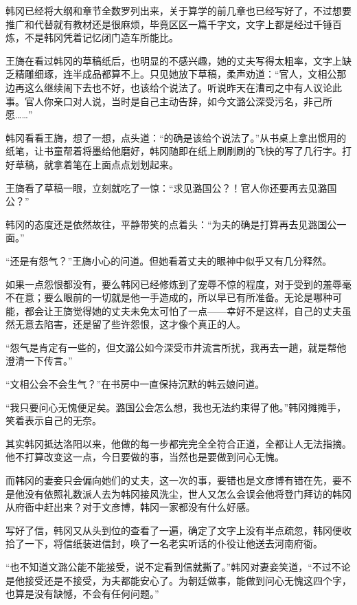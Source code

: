 韩冈已经将大纲和章节全数罗列出来，关于算学的前几章也已经写好了，不过想要推广和代替就有教材还是很麻烦，毕竟区区一篇千字文，文字上都是经过千锤百炼，不是韩冈凭着记忆闭门造车所能比。

王旖在看过韩冈的草稿纸后，也明显的不感兴趣，她的丈夫写得太粗率，文字上缺乏精雕细琢，连半成品都算不上。只见她放下草稿，柔声劝道：“官人，文相公那边再这么继续闹下去也不好，也该给个说法了。听说昨天在漕司之中有人议论此事。官人你亲口对人说，当时是自己主动告辞，如今文潞公深受污名，非己所愿……”

韩冈看看王旖，想了一想，点头道：“的确是该给个说法了。”从书桌上拿出惯用的纸笔，让书童帮着将墨给他磨好，韩冈随即在纸上刷刷刷的飞快的写了几行字。打好草稿，就拿着笔在上面点点划划起来。

王旖看了草稿一眼，立刻就吃了一惊：“求见潞国公？！官人你还要再去见潞国公？”

韩冈的态度还是依然故往，平静带笑的点着头：“为夫的确是打算再去见潞国公一面。”

“还是有怨气？”王旖小心的问道。但她看着丈夫的眼神中似乎又有几分释然。

如果一点怨恨都没有，要么韩冈已经修炼到了宠辱不惊的程度，对于受到的羞辱毫不在意；要么眼前的一切就是他一手造成的，所以早已有所准备。无论是哪种可能，都会让王旖觉得她的丈夫未免太可怕了一点——幸好不是这样，自己的丈夫虽然无意去陷害，还是留了些许怨恨，这才像个真正的人。

“怨气是肯定有一些的，但文潞公如今深受市井流言所扰，我再去一趟，就是帮他澄清一下传言。”

“文相公会不会生气？”在书房中一直保持沉默的韩云娘问道。

“我只要问心无愧便足矣。潞国公会怎么想，我也无法约束得了他。”韩冈摊摊手，笑着表示自己的无奈。

其实韩冈抵达洛阳以来，他做的每一步都完完全全符合正道，全都让人无法指摘。他不打算改变这一点，今日要做的事，当然也是要做到问心无愧。

而韩冈的妻妾只会偏向她们的丈夫，这一次的事，要错也是文彦博有错在先，要不是他没有依照礼数派人去为韩冈接风洗尘，世人又怎么会误会他将登门拜访的韩冈从府衙中赶出来？对于文彦博，韩冈一家都没有什么好感。

写好了信，韩冈又从头到位的查看了一遍，确定了文字上没有半点疏忽，韩冈便收拾了一下，将信纸装进信封，唤了一名老实听话的仆役让他送去河南府衙。

“也不知道文潞公能不能接受，说不定看到信就撕了。”韩冈对妻妾笑道，“不过不论是他接受还是不接受，为夫都能安心了。为朝廷做事，能做到问心无愧这四个字，也算是没有缺憾，不会有任何问题。”

